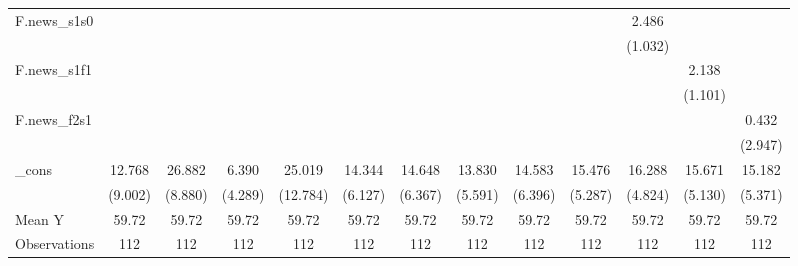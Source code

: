 {\begin{tabular}{l*{12}{c}}
\addlinespace
F.news\_s1s0 &                     &                     &                     &                     &                     &                     &                     &                     &                     &       2.486\sym{**} &                     &                     \\
            &                     &                     &                     &                     &                     &                     &                     &                     &                     &     (1.032)         &                     &                     \\
\addlinespace
F.news\_s1f1 &                     &                     &                     &                     &                     &                     &                     &                     &                     &                     &       2.138\sym{*}  &                     \\
            &                     &                     &                     &                     &                     &                     &                     &                     &                     &                     &     (1.101)         &                     \\
\addlinespace
F.news\_f2s1 &                     &                     &                     &                     &                     &                     &                     &                     &                     &                     &                     &       0.432         \\
            &                     &                     &                     &                     &                     &                     &                     &                     &                     &                     &                     &     (2.947)         \\
\addlinespace
\_cons      &      12.768         &      26.882\sym{***}&       6.390         &      25.019\sym{*}  &      14.344\sym{**} &      14.648\sym{**} &      13.830\sym{**} &      14.583\sym{**} &      15.476\sym{**} &      16.288\sym{***}&      15.671\sym{***}&      15.182\sym{**} \\
            &     (9.002)         &     (8.880)         &     (4.289)         &    (12.784)         &     (6.127)         &     (6.367)         &     (5.591)         &     (6.396)         &     (5.287)         &     (4.824)         &     (5.130)         &     (5.371)         \\
\midrule
Mean Y      &       59.72         &       59.72         &       59.72         &       59.72         &       59.72         &       59.72         &       59.72         &       59.72         &       59.72         &       59.72         &       59.72         &       59.72         \\
Observations&         112         &         112         &         112         &         112         &         112         &         112         &         112         &         112         &         112         &         112         &         112         &         112         \\
\bottomrule
\end{tabular}
}
